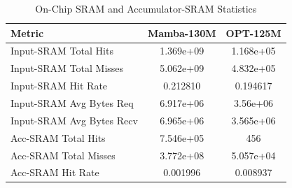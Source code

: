 \begin{table}[h]\centering
    \caption{On-Chip SRAM and Accumulator-SRAM Statistics}
    \label{tab:sram_detailed}
    \begin{tabular}{lcc}\hline
    Metric & Mamba-130M & OPT-125M \\\hline
        Input-SRAM Total Hits & 1.369e+09 & 1.168e+05 \\
    Input-SRAM Total Misses & 5.062e+09 & 4.832e+05 \\
    Input-SRAM Hit Rate & 0.212810 & 0.194617 \\
    Input-SRAM Avg Bytes Req & 6.917e+06 & 3.56e+06 \\
    Input-SRAM Avg Bytes Recv & 6.965e+06 & 3.565e+06 \\
    Acc-SRAM Total Hits & 7.546e+05 & 456 \\
    Acc-SRAM Total Misses & 3.772e+08 & 5.057e+04 \\
    Acc-SRAM Hit Rate & 0.001996 & 0.008937 \\
\hline\end{tabular}\end{table}